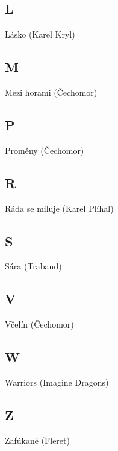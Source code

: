 \subsection*{L}
Lásko (Karel Kryl)

\subsection*{M}
Mezi horami (Čechomor)


\subsection*{P}
Proměny (Čechomor)

\subsection*{R}
Ráda se miluje (Karel Plíhal)

\subsection*{S}
Sára (Traband)


\subsection*{V}
Včelín (Čechomor)

\subsection*{W}
Warriors (Imagine Dragons)


\subsection*{Z}
Zafúkané (Fleret)

\newpage